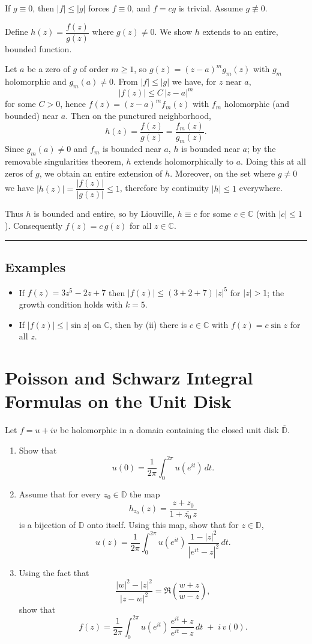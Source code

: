 \documentclass[11pt]{article}
\begin{document}
If $g\equiv 0$, then $|f|\le |g|$ forces $f\equiv 0$, and $f=cg$ is trivial. Assume $g\not\equiv 0$.

Define $h(z)=\dfrac{f(z)}{g(z)}$ where $g(z)\ne 0$. We show $h$ extends to an entire, bounded function.

Let $a$ be a zero of $g$ of order $m\ge 1$, so $g(z)=(z-a)^{m}g_m(z)$ with $g_m$ holomorphic and $g_m(a)\ne 0$. From $|f|\le |g|$ we have, for $z$ near $a$,
\[
|f(z)|\le C\,|z-a|^{m}
\]
for some $C>0$, hence $f(z)=(z-a)^{m}f_m(z)$ with $f_m$ holomorphic (and bounded) near $a$. Then on the punctured neighborhood,
\[
h(z)=\frac{f(z)}{g(z)}=\frac{f_m(z)}{g_m(z)}.
\]
Since $g_m(a)\neq 0$ and $f_m$ is bounded near $a$, $h$ is bounded near $a$; by the removable singularities theorem, $h$ extends holomorphically to $a$. Doing this at all zeros of $g$, we obtain an entire extension of $h$. Moreover, on the set where $g\neq 0$ we have $|h(z)|=\dfrac{|f(z)|}{|g(z)|}\le 1$, therefore by continuity $|h|\le 1$ everywhere.

Thus $h$ is bounded and entire, so by Liouville, $h\equiv c$ for some $c\in\mathbb C$ (with $|c|\le 1$). Consequently $f(z)=c\,g(z)$ for all $z\in\mathbb C$.

\bigskip\hrule\bigskip

\subsection*{Examples}

\begin{itemize}
	\item If $f(z)=3z^{5}-2z+7$ then $|f(z)|\le (3+2+7)\,|z|^{5}$ for $|z|>1$; the growth condition holds with $k=5$.
	\item If $|f(z)|\le |\sin z|$ on $\mathbb{C}$, then by (ii) there is $c\in\mathbb{C}$ with $f(z)=c\sin z$ for all $z$.
\end{itemize}
	


	
	\section*{Poisson and Schwarz Integral Formulas on the Unit Disk}
	Let $f=u+iv$ be holomorphic in a domain containing the closed unit disk $\overline{\mathbb D}$.
	
	\begin{enumerate}
		\item[(a)] Show that
		\[
		u(0)=\frac{1}{2\pi}\int_{0}^{2\pi} u(e^{it})\,dt.
		\]
		\item[(b)] Assume that for every $z_0\in \mathbb D$ the map
		\[
		h_{z_0}(z)=\frac{z+z_0}{1+\overline{z_0}\,z}
		\]
		is a bijection of $\mathbb D$ onto itself. Using this map, show that for $z\in\mathbb D$,
		\[
		u(z)=\frac{1}{2\pi}\int_{0}^{2\pi} u(e^{it})\,
		\frac{1-|z|^{2}}{|e^{it}-z|^{2}}\,dt .
		\]
		\item[(c)] Using the fact that
		\[
		\frac{|w|^{2}-|z|^{2}}{|z-w|^{2}}
		=\Re\!\left(\frac{w+z}{w-z}\right),
		\]
		show that
		\[
		f(z)=\frac{1}{2\pi}\int_{0}^{2\pi} u(e^{it})\,
		\frac{e^{it}+z}{e^{it}-z}\,dt\;+\; i\,v(0).
		\]
	\end{enumerate}
	
\end{document}
